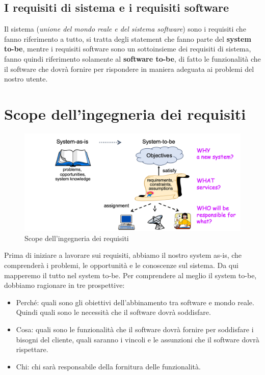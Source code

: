 \subsection{I requisiti di sistema e i requisiti software}
Il sistema (\textit{unione del mondo reale e del sistema software}) sono 
i requisiti che fanno riferimento a tutto, si tratta degli statement che 
fanno parte del \textbf{system to-be}, mentre i requisiti software
sono un sottoinsieme dei requisiti di sistema, fanno quindi riferimento
solamente al \textbf{software to-be}, di fatto le funzionalità che il software 
che dovrà fornire per rispondere in maniera adeguata ai 
problemi del nostro utente.

\section{Scope dell'ingegneria dei requisiti}
\begin{figure}[H]
    \centering
    \includegraphics[scale=0.3]{img/scope.png}
    \caption{Scope dell'ingegneria dei requisiti}
    \label{fig:scope}
\end{figure}
Prima di iniziare a lavorare sui requisiti, abbiamo il nostro 
system as-is, che comprenderà i problemi, le opportunità e le 
conoscenze sul sistema. Da qui mapperemo il tutto nel 
system to-be. Per comprendere al meglio il system to-be,
dobbiamo ragionare in tre prospettive:
\begin{itemize}
    \item Perché: quali sono gli obiettivi dell'abbinamento 
    tra software e mondo reale. Quindi quali sono le necessità 
    che il software dovrà soddisfare.
    \item Cosa: quali sono le funzionalità che il software dovrà
    fornire per soddisfare i bisogni del cliente, quali saranno i 
    vincoli e le assunzioni che il software dovrà rispettare.
    \item Chi: chi sarà responsabile della fornitura 
    delle funzionalità.
\end{itemize}